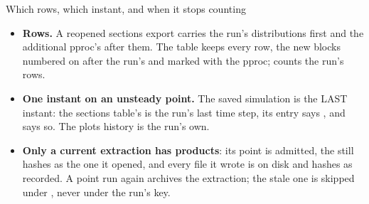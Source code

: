 \begin{frame}{Which rows, which instant, and when it stops counting}
\begin{itemize}\small
  \item \textbf{Rows.} A reopened sections export carries the run's
        distributions first and the additional pproc's after them. The table
        keeps every row, the new blocks numbered on after the run's and marked
        with the pproc;  counts the run's rows.
  \item \textbf{One instant on an unsteady point.} The saved simulation is the
        LAST instant: the sections table's  is the run's last time
        step, its entry says , and  says so.
        The plots history is the run's own.
  \item \textbf{Only a current extraction has products}: its point is admitted,
        the  still hashes as the one it opened, and every file it
        wrote is on disk and hashes as recorded. A point run again archives the
        extraction; the stale one is skipped under
        , never under the run's key.
\end{itemize}
\end{frame}
